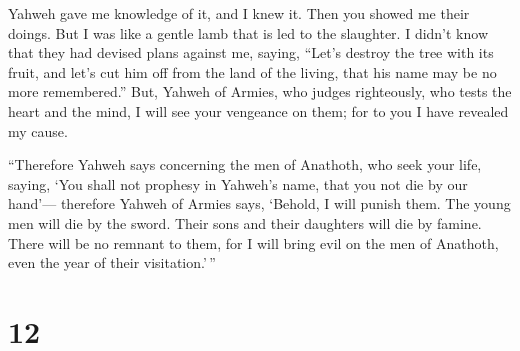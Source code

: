  Yahweh gave me knowledge of it, and I knew it. Then you
showed me their doings.  But I was like a gentle lamb
that is led to the slaughter. I didn't know that they had devised plans
against me, saying, ``Let's destroy the tree with its fruit, and let's
cut him off from the land of the living, that his name may be no more
remembered.''  But, Yahweh of Armies, who judges
righteously, who tests the heart and the mind, I will see your vengeance
on them; for to you I have revealed my cause.

 ``Therefore Yahweh says concerning the men of Anathoth,
who seek your life, saying, `You shall not prophesy in Yahweh's name,
that you not die by our hand'---  therefore Yahweh of
Armies says, `Behold, I will punish them. The young men will die by the
sword. Their sons and their daughters will die by famine.
 There will be no remnant to them, for I will bring evil
on the men of Anathoth, even the year of their visitation.'\,''

\hypertarget{section-11}{%
\section{12}\label{section-11}}


